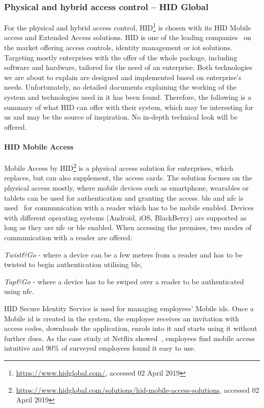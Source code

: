 \subsubsection{Physical and hybrid access control -- HID Global} \label{sec:pacs-hid}

For the physical and hybrid access control, HID\footnote{\url{https://www.hidglobal.com/}, accessed 02 April 2019} is chosen with its HID Mobile access and Extended Access solutions. HID is one of the leading companies~\cite{TopManufacturers} on the market offering access controls, identity management or \acrshort{iot} solutions. Targeting mostly enterprises with the offer of the whole package, including software and hardware, tailored for the need of an enterprise. Both technologies we are about to explain are designed and implemented based on enterprise’s needs. Unfortunately, no detailed documents explaining the working of the system and technologies used in it has been found. Therefore, the following is a summary of what HID can offer with their system, which may be interesting for us and may be the source of inspiration. No in-depth technical look will be offered.

\paragraph{HID Mobile Access}
Mobile Access by HID\footnote{\url{https://www.hidglobal.com/solutions/hid-mobile-access-solutions}, accessed 02 April 2019} is a physical access solution for enterprises, which replaces, but can also supplement, the access cards. The solution focuses on the physical access mostly, where mobile devices such as smartphone, wearables or tablets can be used for authentication and granting the access. \acrshort{ble} and \acrshort{nfc} is used~\cite{HIDGlobal2014HIDGlobal} for communication with a reader which has to be mobile enabled. Devices with different operating systems (Android, iOS, BlackBerry) are supported as long as they are \acrshort{nfc} or \acrshort{ble} enabled. When accessing the premises, two modes of communication with a reader are offered: 
%
\begin{enumerate*}[label=(\roman*)]
    \item \textit{Twist\&Go} - where a device can be a few meters from a reader and has to be twisted to begin authentication utilising \acrshort{ble},
    \item \textit{Tap\&Go} - where a device has to be swiped over a reader to be authenticated using \acrshort{nfc}.
\end{enumerate*}
%
HID Secure Identity Service is used for managing employees’ Mobile \acrshort{id}s. Once a Mobile \acrshort{id} is created in the system, the employee receives an invitation with access codes, downloads the application, enrols into it and starts using it without further dues. As the case study at Netflix showed~\cite{2012NetflixPilot}, employees find mobile access intuitive and 90\% of surveyed employees found it easy to use.

